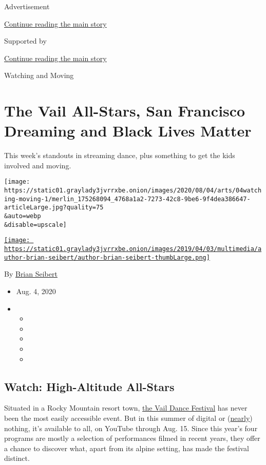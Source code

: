 Advertisement

\protect\hyperlink{after-top}{Continue reading the main story}

Supported by

\protect\hyperlink{after-sponsor}{Continue reading the main story}

Watching and Moving

\hypertarget{the-vail-all-stars-san-francisco-dreaming-and-black-lives-matter}{%
\section{The Vail All-Stars, San Francisco Dreaming and Black Lives
Matter}\label{the-vail-all-stars-san-francisco-dreaming-and-black-lives-matter}}

This week's standouts in streaming dance, plus something to get the kids
involved and moving.

\texttt{[image: https://static01.graylady3jvrrxbe.onion/images/2020/08/04/arts/04watching-moving-1/merlin\_175268094\_4768a1a2-7273-42c8-9be6-9f4dea386647-articleLarge.jpg?quality=75\\\&auto=webp\\\&disable=upscale]}

\href{https://www.nytimes3xbfgragh.onion/by/brian-seibert}{\texttt{[image: https://static01.graylady3jvrrxbe.onion/images/2019/04/03/multimedia/author-brian-seibert/author-brian-seibert-thumbLarge.png]}}

By \href{https://www.nytimes3xbfgragh.onion/by/brian-seibert}{Brian
Seibert}

\begin{itemize}
\item
  Aug. 4, 2020
\item
  \begin{itemize}
  \item
  \item
  \item
  \item
  \item
  \end{itemize}
\end{itemize}

\hypertarget{watch-high-altitude-all-stars}{%
\subsection{Watch: High-Altitude
All-Stars}\label{watch-high-altitude-all-stars}}

Situated in a Rocky Mountain resort town,
\href{https://vaildance.org/}{the Vail Dance Festival} has never been
the most easily accessible event. But in this summer of digital or
(\href{https://www.nytimes3xbfgragh.onion/2020/07/29/arts/dance/kaatsbaan-dance-festival-stella-abrera.html}{nearly})
nothing, it's available to all, on YouTube through Aug. 15. Since this
year's four programs are mostly a selection of performances filmed in
recent years, they offer a chance to discover what, apart from its
alpine setting, has made the festival distinct.

